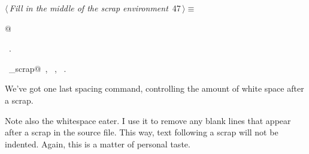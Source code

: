\documentclass[a4paper]{report}
\begin{document}
\begin{flushleft} \small
\begin{minipage}{\linewidth}\label{scrap88}\raggedright\small
{} $\langle\,${\it Fill in the middle of the scrap environment}\nobreak\ {\footnotesize {47}}$\,\rangle\equiv$
\vspace{-1ex}
\begin{list}{}{} \item
\mbox{}@{\NWsep}
\end{list}
\vspace{-1.5ex}
\footnotesize
\begin{list}{}{\setlength{\itemsep}{-\parsep}\setlength{\itemindent}{-\leftmargin}}
\item \NWtxtMacroRefIn\ .
\item \NWtxtIdentsUsed\nobreak\  \verb@copy_scrap@\nobreak\ , \verb@fputs@\nobreak\ , \verb@TRUE@\nobreak\ .
\item{}
\end{list}
\end{minipage}\vspace{4ex}
\end{flushleft}
\newpage
\noindent
We've got one last spacing command, controlling the amount of white
space after a scrap.

Note also the whitespace eater. I use it to remove any blank lines
that appear after a scrap in the source file. This way, text following
a scrap will not be indented. Again, this is a matter of personal taste.
\end{document}
